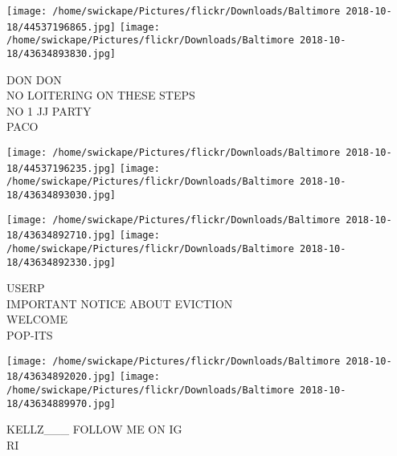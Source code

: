 \documentclass[10pt,letterpaper]{article}
\begin{document}
\texttt{[image: /home/swickape/Pictures/flickr/Downloads/Baltimore 2018-10-18/44537196865.jpg]}
\texttt{[image: /home/swickape/Pictures/flickr/Downloads/Baltimore 2018-10-18/43634893830.jpg]}

DON DON\\
NO LOITERING ON THESE STEPS\\
NO 1 JJ PARTY\\
PACO
\pagebreak

\texttt{[image: /home/swickape/Pictures/flickr/Downloads/Baltimore 2018-10-18/44537196235.jpg]}
\texttt{[image: /home/swickape/Pictures/flickr/Downloads/Baltimore 2018-10-18/43634893030.jpg]}

\texttt{[image: /home/swickape/Pictures/flickr/Downloads/Baltimore 2018-10-18/43634892710.jpg]}
\texttt{[image: /home/swickape/Pictures/flickr/Downloads/Baltimore 2018-10-18/43634892330.jpg]}

USERP\\
IMPORTANT NOTICE ABOUT EVICTION\\
WELCOME\\
POP{-}ITS
\pagebreak

\texttt{[image: /home/swickape/Pictures/flickr/Downloads/Baltimore 2018-10-18/43634892020.jpg]}
\texttt{[image: /home/swickape/Pictures/flickr/Downloads/Baltimore 2018-10-18/43634889970.jpg]}

KELLZ\_\_\_ FOLLOW ME ON IG\\
RI
\pagebreak
\end{document}

